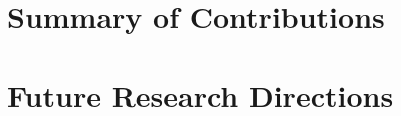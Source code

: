 
\section{Summary of Contributions}
\label{sec:summary_of_contributions}


\section{Future Research Directions}
\label{sec:future_research_directions}